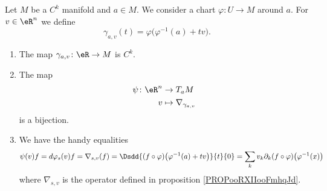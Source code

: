 \begin{proposition}     \label{PROPooRXIIooFmhqJd}
	Let \( M\) be a \( C^k\) manifold and \( a\in M\). We consider a chart \( \varphi\colon U\to M\) around \( a\). For \( v\in \eR^n\) we define
	\begin{equation}
		\gamma_{a,v}(t)=\varphi\big( \varphi^{-1}(a)+tv \big).
	\end{equation}
	\begin{enumerate}
		\item
		      The map \( \gamma_{a,v}\colon \eR\to M\) is \( C^k\).
		\item
		      The map
		      \begin{equation}
			      \begin{aligned}
				      \psi\colon \eR^n & \to T_aM                      \\
				      v                & \mapsto \nabla_{\gamma_{a,v}}
			      \end{aligned}
		      \end{equation}
		      is a bijection.
		\item
		      We have the handy equalities
		      \begin{equation}
			      \psi(v)f=d\varphi_s(v)f=\nabla_{s,v}(f)=\Dsdd{ (f\circ\varphi)\big( \varphi^{-1}(a)+tv \big) }{t}{0}=\sum_kv_k\partial_k(f\circ\varphi)\big( \varphi^{-1}(x) \big)
		      \end{equation}
		      where \( \nabla_{s,v}\) is the operator defined in proposition \ref{PROPooRXIIooFmhqJd}.
	\end{enumerate}
\end{proposition}

